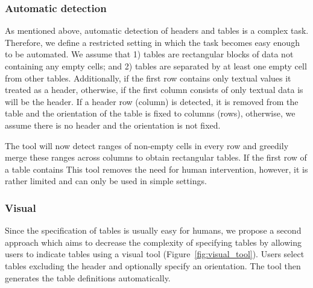 \documentclass{IEEEtran}
\theoremstyle{definition}
\begin{document}
\subsubsection{Automatic detection}
As mentioned above, automatic detection of headers and tables is a complex task.
Therefore, we define a restricted setting in which the task becomes easy enough to be automated.
We assume that 1) tables are rectangular blocks of data not containing any empty cells; and 2) tables are separated by at least one empty cell from other tables.
Additionally, if the first row contains only textual values it treated as a header, otherwise, if the first column consists of only textual data is will be the header.
If a header row (column) is detected, it is removed from the table and the orientation of the table is fixed to columns (rows), otherwise, we assume there is no header and the orientation is not fixed.

The tool will now detect ranges of non-empty cells in every row and greedily merge these ranges across columns to obtain rectangular tables.
If the first row of a table contains 
This tool removes the need for human intervention, however, it is rather limited and can only be used in simple settings.





\subsubsection{Visual}
Since the specification of tables is usually easy for humans, we propose a second approach which aims to decrease the complexity of specifying tables by allowing users to indicate tables using a visual tool (Figure~\ref{fig:visual_tool}).
Users select tables excluding the header and optionally specify an orientation.
The tool then generates the table definitions automatically.
\end{document}

